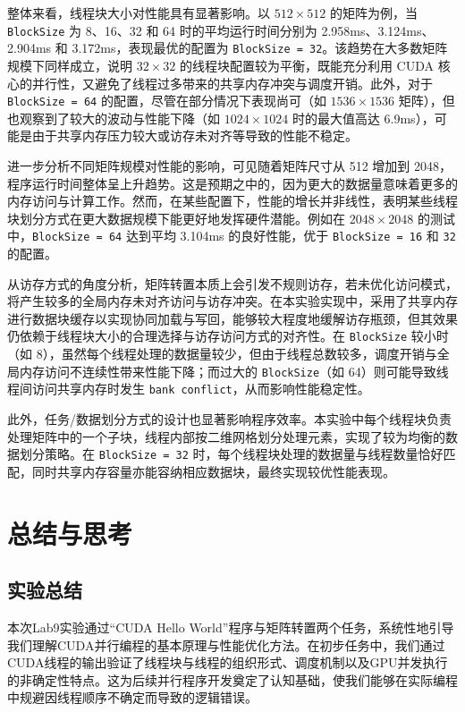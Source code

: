 \documentclass[a4paper, utf8]{ctexart}
\begin{document}
	整体来看，线程块大小对性能具有显著影响。以 $512\times512$ 的矩阵为例，当 \verb|BlockSize| 为 8、16、32 和 64 时的平均运行时间分别为 2.958ms、3.124ms、2.904ms 和 3.172ms，表现最优的配置为 \verb|BlockSize = 32|。该趋势在大多数矩阵规模下同样成立，说明 $32\times32$ 的线程块配置较为平衡，既能充分利用 CUDA 核心的并行性，又避免了线程过多带来的共享内存冲突与调度开销。此外，对于 \verb|BlockSize = 64| 的配置，尽管在部分情况下表现尚可（如 $1536\times1536$ 矩阵），但也观察到了较大的波动与性能下降（如 $1024\times1024$ 时的最大值高达 6.9ms），可能是由于共享内存压力较大或访存未对齐等导致的性能不稳定。
	
	进一步分析不同矩阵规模对性能的影响，可见随着矩阵尺寸从 512 增加到 2048，程序运行时间整体呈上升趋势。这是预期之中的，因为更大的数据量意味着更多的内存访问与计算工作。然而，在某些配置下，性能的增长并非线性，表明某些线程块划分方式在更大数据规模下能更好地发挥硬件潜能。例如在 $2048\times2048$ 的测试中，\verb|BlockSize = 64| 达到平均 3.104ms 的良好性能，优于 \verb|BlockSize = 16| 和 \verb|32| 的配置。
	
	从访存方式的角度分析，矩阵转置本质上会引发不规则访存，若未优化访问模式，将产生较多的全局内存未对齐访问与访存冲突。在本实验实现中，采用了共享内存进行数据块缓存以实现协同加载与写回，能够较大程度地缓解访存瓶颈，但其效果仍依赖于线程块大小的合理选择与访存访问方式的对齐性。在 \verb|BlockSize| 较小时（如 8），虽然每个线程处理的数据量较少，但由于线程总数较多，调度开销与全局内存访问不连续性带来性能下降；而过大的 \verb|BlockSize|（如 64）则可能导致线程间访问共享内存时发生 \verb|bank conflict|，从而影响性能稳定性。
	
	此外，任务/数据划分方式的设计也显著影响程序效率。本实验中每个线程块负责处理矩阵中的一个子块，线程内部按二维网格划分处理元素，实现了较为均衡的数据划分策略。在 \verb|BlockSize = 32| 时，每个线程块处理的数据量与线程数量恰好匹配，同时共享内存容量亦能容纳相应数据块，最终实现较优性能表现。
	
	\section{总结与思考}
	
	\subsection{实验总结}
	
	本次Lab9实验通过“CUDA Hello World”程序与矩阵转置两个任务，系统性地引导我们理解CUDA并行编程的基本原理与性能优化方法。在初步任务中，我们通过CUDA线程的输出验证了线程块与线程的组织形式、调度机制以及GPU并发执行的非确定性特点。这为后续并行程序开发奠定了认知基础，使我们能够在实际编程中规避因线程顺序不确定而导致的逻辑错误。
	
\end{document}
